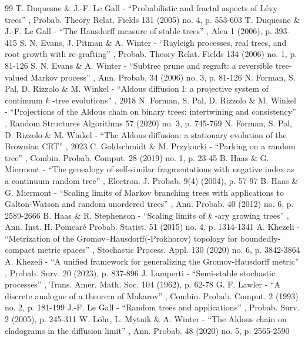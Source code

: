 \documentclass[11pt]{article}
\theoremstyle{definition}
\begin{document}
\begin{thebibliography}{99}
 T. Duquesne \& J.-F. Le Gall - “Probabilistic and fractal aspects of Lévy trees” , Probab. Theory Relat. Fields 131 (2005) no. 4, p. 553-603
 T. Duquesne \& J.-F. Le Gall - “The Hausdorff measure of stable trees” , Alea 1 (2006), p. 393-415
 S. N. Evans, J. Pitman \& A. Winter - “Rayleigh processes, real trees, and root growth with re-grafting” , Probab. Theory Relat. Fields 134 (2006) no. 1, p. 81-126
 S. N. Evans \& A. Winter - “Subtree prune and regraft: a reversible tree-valued Markov process” , Ann. Probab. 34 (2006) no. 3, p. 81-126
 N. Forman, S. Pal, D. Rizzolo \& M. Winkel - “Aldous diffusion I: a projective system of continuum $k$ -tree evolutions” , 2018
 N. Forman, S. Pal, D. Rizzolo \& M. Winkel - “Projections of the Aldous chain on binary trees: intertwining and consistency” , Random Structures Algorithms 57 (2020) no. 3, p. 745-769
 N. Forman, S. Pal, D. Rizzolo \& M. Winkel - “The Aldous diffusion: a stationary evolution of the Brownian CRT” , 2023
 C. Goldschmidt \& M. Przykucki - “Parking on a random tree” , Combin. Probab. Comput. 28 (2019) no. 1, p. 23-45
 B. Haas \& G. Miermont - “The genealogy of self-similar fragmentations with negative index as a continuum random tree” , Electron. J. Probab. 9(4) (2004), p. 57-97
 B. Haas \& G. Miermont - “Scaling limits of Markov branching trees with applications to Galton-Watson and random unordered trees” , Ann. Probab. 40 (2012) no. 6, p. 2589-2666
 B. Haas \& R. Stephenson - “Scaling limits of $k$ -ary growing trees” , Ann. Inst. H. Poincaré Probab. Statist. 51 (2015) no. 4, p. 1314-1341
 A. Khezeli - “Metrization of the Gromov–Hausdorff(-Prokhorov) topology for boundedly-compact metric spaces” , Stochastic Process. Appl. 130 (2020) no. 6, p. 3842-3864
 A. Khezeli - “A unified framework for generalizing the Gromov-Hausdorff metric” , Probab. Surv. 20 (2023), p. 837-896
 J. Lamperti - “Semi-stable stochastic processes” , Trans. Amer. Math. Soc. 104 (1962), p. 62-78
 G. F. Lawler - “A discrete analogue of a theorem of Makarov” , Combin. Probab. Comput. 2 (1993) no. 2, p. 181-199
 J.-F. Le Gall - “Random trees and applications” , Probab. Surv. 2 (2005), p. 245-311
 W. Löhr, L. Mytnik \& A. Winter - “The Aldous chain on cladograms in the diffusion limit” , Ann. Probab. 48 (2020) no. 5, p. 2565-2590

\end{thebibliography}
\end{document}
